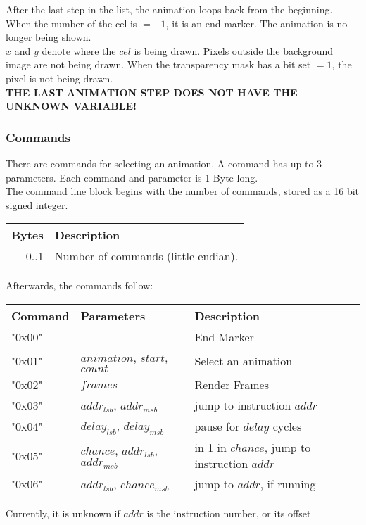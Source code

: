 \documentclass[11pt,twoside,openright]{report}
\begin{document}
After the last step in the list, the animation loops back from the beginning. When the number of the cel is $=-1$, it is an end marker. The animation is no longer being shown.\\

$x$ and $y$ denote where the $cel$ is being drawn. Pixels outside the background image are not being drawn. When the transparency mask has a bit set $=1$, the pixel is not being drawn. \\

{\bf THE LAST ANIMATION STEP DOES NOT HAVE THE UNKNOWN VARIABLE!}

\subsubsection{Commands}
There are commands for selecting an animation. A command has up to 3 parameters. Each command and parameter is 1 Byte long.\\

The command line block begins with the number of commands, stored as a 16 bit signed integer.\\

\begin{tabular}{r|l}
Bytes&Description\\\hline
0..1&Number of commands (little endian).
\end{tabular}

Afterwards, the commands follow:

\begin{tabular}{l|l|l}
Command&Parameters&Description\\\hline
"0x00"&&End Marker\\
"0x01"&$animation$, $start$, $count$&Select an animation\\
"0x02"&$frames$&Render Frames\\
"0x03"&$addr_{lsb}$, $addr_{msb}$&jump to instruction $addr$\\
"0x04"&$delay_{lsb}$, $delay_{msb}$&pause for $delay$ cycles\\
"0x05"&$chance$, $addr_{lsb}$, $addr_{msb}$&in 1 in $chance$, jump to instruction $addr$\\
"0x06"&$addr_{lsb}$, $chance_{msb}$&jump to $addr$, if running\\
\end{tabular}

Currently, it is unknown if $addr$ is the instruction number, or its offset\\
\end{document}
